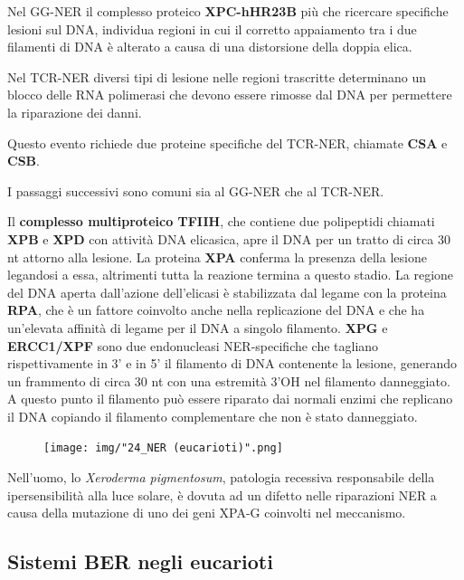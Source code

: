 \documentclass[11pt]{book}
\begin{document}
Nel GG-NER il complesso proteico \textbf{XPC-hHR23B} più che ricercare
specifiche lesioni sul DNA, individua regioni in cui il corretto
appaiamento tra i due filamenti di DNA è alterato a causa di una
distorsione della doppia elica.

Nel TCR-NER diversi tipi di lesione nelle regioni trascritte determinano
un blocco delle RNA polimerasi che devono essere rimosse dal DNA per
permettere la riparazione dei danni.

Questo evento richiede due proteine specifiche del TCR-NER, chiamate
\textbf{CSA} e \textbf{CSB}.

I passaggi successivi sono comuni sia al GG-NER che al TCR-NER.

Il \textbf{complesso multiproteico TFIIH}, che contiene due polipeptidi
chiamati \textbf{XPB} e \textbf{XPD} con attività DNA elicasica, apre il
DNA per un tratto di circa 30 nt attorno alla lesione. La proteina
\textbf{XPA} conferma la presenza della lesione legandosi a essa,
altrimenti tutta la reazione termina a questo stadio. La regione del DNA
aperta dall'azione dell'elicasi è stabilizzata dal legame con la
proteina \textbf{RPA}, che è un fattore coinvolto anche nella
replicazione del DNA e che ha un'elevata affinità di legame per il DNA a
singolo filamento. \textbf{XPG} e \textbf{ERCC1/XPF} sono due
endonucleasi NER-specifiche che tagliano rispettivamente in 3' e in 5'
il filamento di DNA contenente la lesione, generando un frammento di
circa 30 nt con una estremità 3'OH nel filamento danneggiato. A questo
punto il filamento può essere riparato dai normali enzimi che replicano
il DNA copiando il filamento complementare che non è stato danneggiato.

\clearpage

\begin{figure}[htp]
\centering
\texttt{[image: img/"24\_NER (eucarioti)".png]}
\caption{}
\label{ner-eucarioti}
\end{figure}

\clearpage

Nell'uomo, lo \emph{Xeroderma pigmentosum}, patologia recessiva
responsabile della ipersensibilità alla luce solare, è dovuta ad un
difetto nelle riparazioni NER a causa della mutazione di uno dei geni
XPA-G coinvolti nel meccanismo.

\subsection{Sistemi BER negli
eucarioti}\label{sistemi-ber-negli-eucarioti}
\end{document}
